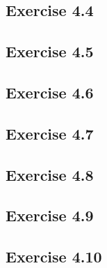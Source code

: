 \documentclass[11pt]{article}
\theoremstyle{definition}
\theoremstyle{remark}
\begin{document}
\subsection{Exercise 4.4}

\subsection{Exercise 4.5}

\subsection{Exercise 4.6}

\subsection{Exercise 4.7}

\subsection{Exercise 4.8}

\subsection{Exercise 4.9}

\subsection{Exercise 4.10}

\end{document}
